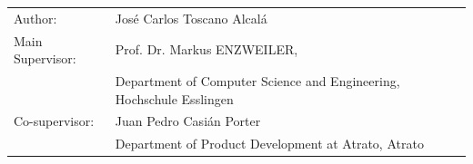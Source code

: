 \begin{titlepage}
	\begin{table}[h!]
		\begin{small} \sffamily
			\begin{tabular}{p{}p{}}
				Author: & José Carlos Toscano Alcalá \\
				Main Supervisor:    & Prof. Dr. Markus ENZWEILER, \\
				& Department of Computer Science and Engineering, Hochschule Esslingen \\
				Co-supervisor:      & Juan Pedro Casián Porter \\
				& Department of Product Development at Atrato, Atrato \\
				
			\end{tabular}
		\end{small}
	\end{table}
	
\end{titlepage}
